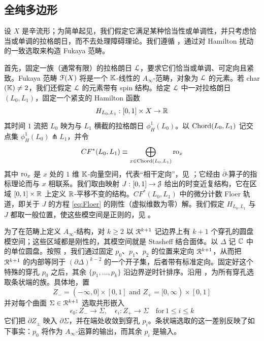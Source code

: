 \subsection{全纯多边形}

设 $X$ 是辛流形；为简单起见，我们假定它满足某种恰当性或单调性，并只考虑恰当或单调的拉格朗日，而不去处理障碍理论。我们遵循 \cite{FCPLT, Sheridan3}，通过对 Hamilton 扰动的一致选取来构造 Fukaya 范畴。

首先，固定一族（通常有限）的拉格朗日 $\EuScript{L}$，要求它们恰当或单调、可定向且紧致。Fukaya 范畴 $\EuScript{F}(X)$ 将是一个 $\mathbb{K}$-线性的 $A_{\infty}$-范畴，对象为 $\EuScript{L}$ 的元素。若 char$(\mathbb{K})\neq 2$，我们还假定 $\EuScript{L}$ 的元素带有 spin 结构。给定 $\EuScript{L}$ 中一对拉格朗日 $(L_0, L_1)$，固定一个紧支的 Hamilton 函数
\begin{equation}
  H_{L_0,L_1} :  [0,1] \times X \rightarrow \mathbb{R}
\end{equation}
其时间 $1$ 流把 $L_0$ 映为与 $L_1$ 横截的拉格朗日 $\phi_H^1(L_0)$。以 $\operatorname{Chord}(L_0,L_1)$ 记交点集 $\phi_H^1(L_0) \pitchfork L_1$，并令
\begin{equation}
  CF^*(L_0,L_1) \equiv \bigoplus_{x \in \operatorname{Chord}(L_0,L_1)}  \operatorname{ro}_{x}
\end{equation}
其中 $\operatorname{ro}_x$ 是 $x$ 处的 $1$ 维 $\mathbb{K}$-向量空间，代表“相干定向”，见 \cite[Section 11h]{FCPLT}；它经由 $\overline{\partial}$-算子的指标理论而与 $x$ 相联系。我们取由映射 $J: [0,1] \rightarrow \EuScript{J}$ 给出的时变近复结构，它在区域 $[0,1] \times \mathbb{R}$ 上定义 $\mathbb{R}$-平移不变的结构。$CF^*(L_0,L_1)$ 中的微分计数 Floer 轨道，即关于 $J$ 的方程 \eqref{eq:Floer} 的刚性（虚拟维数为零）解。我们假定 $H_{L_0,L_1}$ 与 $J$ 都取一般位置，使这些模空间是正则的，见 \cite{FHS}。

为了在范畴上定义 $A_{\infty}$-结构，对 $k\geq 2$ 以 $\EuScript{R}^{k+1}$ 记边界上有 $k+1$ 个穿孔的圆盘模空间；这些区域都是刚性的，其模空间就是 Stasheff 结合面体。以 $\Delta$ 记 $\mathbb{C}$ 中的单位圆盘。按照 \cite[Section 12g]{FCPLT}，我们通过固定 $p_0$、$p_1$、$p_2$ 的位置来定向 $\EuScript{R}^{k+1}$，从而把 $\EuScript{R}^{k+1}$ 的内部等同于 $(\partial \Delta)^{k-2}$ 的一个开子集，后者带有标准定向。固定好这个特殊的穿孔 $p_0$ 之后，其余 $\{p_1,\ldots, p_k\}$ 沿边界逆时针排序。沿用 \cite[Section 9g]{FCPLT}，为所有穿孔选取条状端的族。具体地，置
\begin{equation} \label{eqn:in-out-striplike-ends}
  Z_- = (-\infty,0] \times [0,1] \textrm{ and } Z_+ = [0,\infty) \times [0,1]
\end{equation}
并对每个曲面 $\Sigma \in \EuScript{R}^{k+1}$ 选取共形嵌入
\begin{equation}
\epsilon_{0}: Z_- \rightarrow \Sigma, \quad \epsilon_i: Z_+ \rightarrow \Sigma \quad  \textrm{for} \, 1 \leq i \leq k\end{equation}
它们把 $\partial Z_{\pm}$ 映入 $\partial \Sigma$，并在端处收敛到穿孔 $p_i$。条状端选取的这一差别反映了如下事实：$p_0$ 将作为 $A_{\infty}$-运算的输出，而其余 $p_i$ 是输入。

